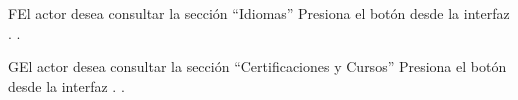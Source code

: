 \begin{UCtrayectoriaA}{F}{El actor desea consultar la sección ``Idiomas''}
	\UCpaso [\UCsist] Presiona el botón  desde la interfaz .
	.
\end{UCtrayectoriaA}

\begin{UCtrayectoriaA}{G}{El actor desea consultar la sección ``Certificaciones y Cursos''}
	\UCpaso [\UCsist] Presiona el botón  desde la interfaz .
	.
\end{UCtrayectoriaA} 




